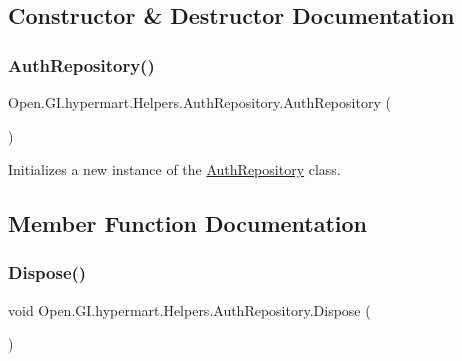 \subsection{Constructor \& Destructor Documentation}
\hypertarget{class_open_1_1_g_i_1_1hypermart_1_1_helpers_1_1_auth_repository_a45b19c0a6f979f86ae43cbded49aeb5a}{}\label{class_open_1_1_g_i_1_1hypermart_1_1_helpers_1_1_auth_repository_a45b19c0a6f979f86ae43cbded49aeb5a} 
\subsubsection{\texorpdfstring{Auth\+Repository()}{AuthRepository()}}
{\footnotesize\ttfamily Open.\+G\+I.\+hypermart.\+Helpers.\+Auth\+Repository.\+Auth\+Repository (\begin{DoxyParamCaption}{ }\end{DoxyParamCaption})}



Initializes a new instance of the \hyperlink{class_open_1_1_g_i_1_1hypermart_1_1_helpers_1_1_auth_repository}{Auth\+Repository} class. 



\subsection{Member Function Documentation}
\hypertarget{class_open_1_1_g_i_1_1hypermart_1_1_helpers_1_1_auth_repository_afd0cd6f5615edaecc5395a7d60c769a6}{}\label{class_open_1_1_g_i_1_1hypermart_1_1_helpers_1_1_auth_repository_afd0cd6f5615edaecc5395a7d60c769a6} 
\subsubsection{\texorpdfstring{Dispose()}{Dispose()}}
{\footnotesize\ttfamily void Open.\+G\+I.\+hypermart.\+Helpers.\+Auth\+Repository.\+Dispose (\begin{DoxyParamCaption}{ }\end{DoxyParamCaption})}



